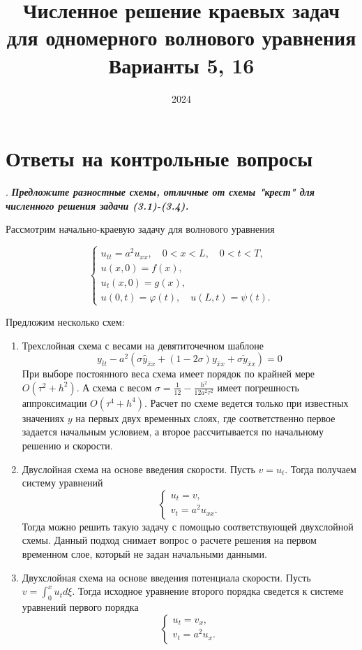 \documentclass[12pt, a4paper]{article}
\title{Численное решение краевых задач
	для одномерного волнового уравнения \\ Варианты 5, 16}
\date{2024}
\renewcommand{\phi}{\varphi}
\newcommand{\widecheck}[1]{\check{#1}}
\newcounter{mycounter}
\newcommand{\quastion}[1]{%
	\stepcounter{mycounter}%
	\textbf{\themycounter}.  %
	\textbf{\textit{#1}}
	
}
\begin{document}
	\maketitle
	\section{Ответы на контрольные вопросы}
	
	\quastion{Предложите разностные схемы, отличные от схемы "крест" для численного решения задачи (3.1)-(3.4).}
	
	Рассмотрим начально-краевую задачу для волнового уравнения
	
	\begin{equation}
		\begin{cases}
			u_{tt} = a^2 u_{xx}, \quad 0<x<L, \quad 0<t<T, \\
			u(x, 0) = f(x), \\
			u_t(x, 0) = g(x), \\
			u(0,t)=\phi(t), \quad u(L,t) = \psi(t).
		\end{cases}
	\end{equation}
	
	Предложим несколько схем:
	\begin{enumerate}
		\item Трехслойная схема с весами на девятиточечном шаблоне 
		\begin{equation*}
				y_{\bar{t}t} - a^2 (\sigma \hat{y}_{\bar{x}x} + (1 - 2 \sigma) y_{\bar{x}x} + \sigma \widecheck{y}_{\bar{x}x}) = 0
		\end{equation*}
		При выборе постоянного веса схема имеет порядок по крайней мере $O(\tau^2 + h^2)$. А схема с весом $\sigma = \frac{1}{12} - \frac{h^2}{12a^2\tau^2}$ имеет погрешность аппроксимации $O(\tau^4 + h^4)$. Расчет по схеме ведется только при известных значениях $y$ на первых двух временных слоях, где соответственно первое задается начальным условием, а второе рассчитывается по начальному решению и скорости.
		
		\item Двуслойная схема на основе введения скорости. Пусть $v = u_t$. Тогда получаем систему уравнений
		\begin{equation}
			\begin{cases}
				u_t = v,\\
				v_t = a^2 u_{xx}.
			\end{cases}
		\end{equation}
		Тогда можно решить такую задачу с помощью соответствующей двухслойной схемы. Данный подход снимает вопрос о расчете решения на первом временном слое, который не задан начальными данными.
		
		\item Двухслойная схема на основе введения потенциала скорости. Пусть $v = \int_{0}^{x} u_t d\xi$. Тогда исходное уравнение второго порядка сведется к системе уравнений первого порядка
		\begin{equation}
			\begin{cases}
				u_t = v_x,\\
				v_t = a^2 u_x.
			\end{cases}
		\end{equation}
	\end{enumerate}
			
\end{document}
